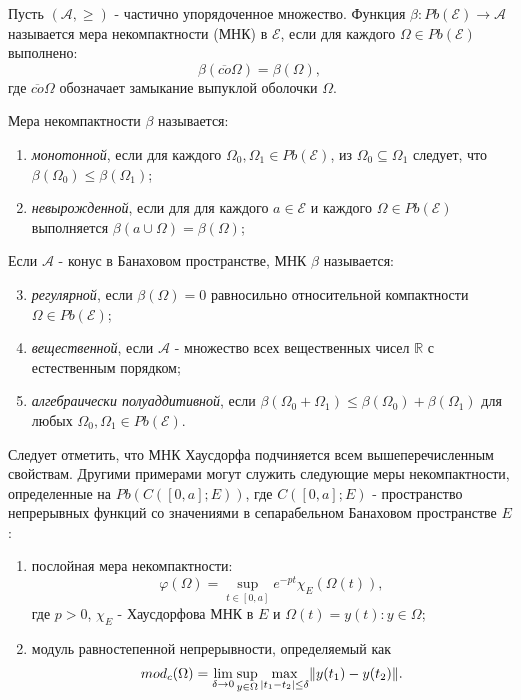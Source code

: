 \begin{definition}
    Пусть $(\mathcal{A}, \geq)$ - частично упорядоченное множество. Функция $\beta : Pb(\mathcal{E}) \rightarrow \mathcal{A}$ называется
    мера некомпактности (МНК) в $\mathcal{E}$, если для каждого $\Omega \in Pb(\mathcal{E})$ выполнено:
    $$\beta(\overline{co}\Omega) = \beta(\Omega),$$
    где $\overline{co}\Omega$ обозначает замыкание выпуклой оболочки $\Omega$.
\end{definition}

Мера некомпактности $\beta$ называется:

\begin{enumerate}
    \item \textit{монотонной}, если для каждого $\Omega_0, \Omega_1 \in Pb(\mathcal{E})$, из $\Omega_0 \subseteq \Omega_1$
    следует, что $\beta(\Omega_0) \leq \beta(\Omega_1)$;
    \item \textit{невырожденной}, если для для каждого $a \in \mathcal{E}$ и каждого $\Omega \in Pb(\mathcal{E})$
    выполняется $\beta({a} \cup \Omega) = \beta(\Omega)$;
\end{enumerate}

Если $\mathcal{A}$ - конус в Банаховом пространстве, МНК $\beta$ называется:

\begin{enumerate}
    \setcounter{enumi}{2}
    \item \textit{регулярной}, если $\beta(\Omega) = 0$ равносильно относительной компактности $\Omega \in Pb(\mathcal{E})$;
    \item \textit{вещественной}, если $\mathcal{A}$ - множество всех вещественных чисел $\mathbb{R}$ с естественным порядком;
    \item \textit{алгебраически полуаддитивной}, если $\beta(\Omega_0 + \Omega_1) \leq \beta(\Omega_0) + \beta(\Omega_1)$ для
    любых $\Omega_0, \Omega_1 \in Pb(\mathcal{E})$.
\end{enumerate}

Следует отметить, что МНК Хаусдорфа подчиняется всем вышеперечисленным свойствам. Другими примерами могут служить следующие
меры некомпактности, определенные на $Pb(C([0, a]; E))$, где $C([0, a]; E)$ - пространство непрерывных функций
со значениями в сепарабельном Банаховом пространстве $E$:

\begin{enumerate}
    \item послойная мера некомпактности:
    $$\varphi(\Omega) = \sup_{t \in [0, a]} e^{-pt} \chi_{E}(\Omega(t)),$$
    где $p > 0$, $\chi_{E}$ - Хаусдорфова МНК в $E$ и $\Omega(t) = {y(t): y \in \Omega}$;
    \item модуль равностепенной непрерывности, определяемый как
    $$mod_{c}(\Omega) = \lim_{\delta \rightarrow 0} \sup_{y \in \Omega} \max_{|t_1 - t_2| \leq \delta} \lVert y(t_1) - y(t_2)\rVert.$$
\end{enumerate}

